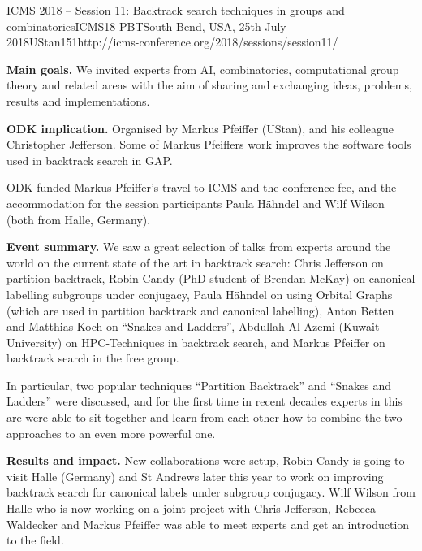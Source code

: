 \begin{event}{ICMS 2018 -- Session 11: Backtrack search techniques in groups and combinatorics}{ICMS18-PBT}{South Bend, USA, 25th July 2018}{UStan}{15}{1}{http://icms-conference.org/2018/sessions/session11/}

\textbf{Main goals.}
We invited experts from AI, combinatorics, computational group theory and
related areas with the aim of sharing and exchanging ideas, problems,
results and implementations.

\textbf{ODK implication.} Organised by Markus Pfeiffer (UStan), and his
colleague Christopher Jefferson. Some of Markus Pfeiffers work improves the
software tools used in backtrack search in GAP.

ODK funded Markus Pfeiffer's travel to ICMS and the conference fee, and the
accommodation for the session participants Paula Hähndel and Wilf Wilson (both
from Halle, Germany).

\textbf{Event summary.} We saw a great selection of talks from experts around
the world on the current state of the art in backtrack search: Chris Jefferson
on partition backtrack, Robin Candy (PhD student of Brendan McKay) on canonical
labelling subgroups under conjugacy, Paula Hähndel on using Orbital Graphs
(which are used in partition backtrack and canonical labelling), Anton Betten
and Matthias Koch on ``Snakes and Ladders'', Abdullah Al-Azemi (Kuwait
University) on HPC-Techniques in backtrack search, and Markus Pfeiffer on
backtrack search in the free group.

In particular, two popular techniques ``Partition Backtrack'' and ``Snakes and
Ladders'' were discussed, and for the first time in recent decades experts in
this are were able to sit together and learn from each other how to combine the
two approaches to an even more powerful one.

\textbf{Results and impact.} New collaborations were setup, Robin Candy is going
to visit Halle (Germany) and St Andrews later this year to work on improving
backtrack search for canonical labels under subgroup conjugacy. Wilf Wilson from
Halle who is now working on a joint project with Chris Jefferson, Rebecca
Waldecker and Markus Pfeiffer was able to meet experts and get an introduction
to the field.

\end{event}
